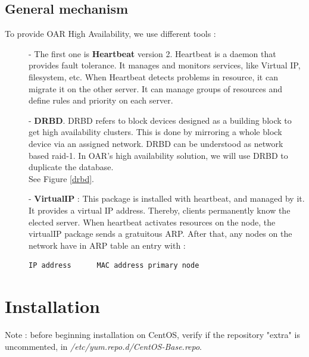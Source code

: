 \documentclass[a4paper,10pt]{report}
\begin{document}
\section{General mechanism}
To provide OAR High Availability, we use different tools :
\begin{description}
\item[]- The first one is \textbf{Heartbeat} version 2. Heartbeat is a daemon that provides fault tolerance. It manages and monitors services, like Virtual IP, filesystem, etc. When Heartbeat detects problems in resource, it can migrate it on the other server. It can manage groups of resources and define rules and priority on each server.
\item[]- \textbf{DRBD}. DRBD refers to block devices designed as a building block to get high availability clusters. This is done by mirroring a whole block device via an assigned network. DRBD can be understood as network based raid-1. In OAR's high availability solution, we will use DRBD to duplicate the database.\\
See Figure \ref{drbd}.
\item[]- \textbf{VirtualIP} : This package is installed with heartbeat, and managed by it. It provides a virtual IP address. Thereby, clients permanently know the elected server.
When heartbeat activates resources on the node, the virtualIP package sends a gratuitous ARP. After that, any nodes on the network have in ARP table an entry with :
\begin{lstlisting}
IP address		MAC address primary node
\end{lstlisting}

\end{description}













\chapter{Installation}

Note : before beginning installation on CentOS, verify if the repository "extra" is uncommented, in \textit{/etc/yum.repo.d/CentOS-Base.repo}.
\end{document}

